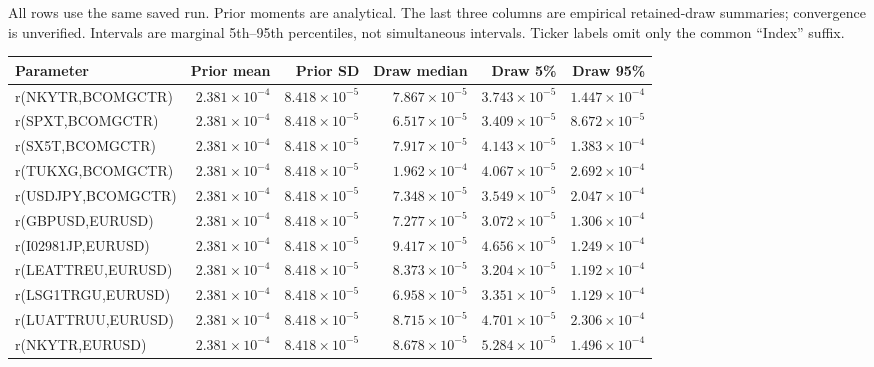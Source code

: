\documentclass[10pt,a4paper]{article}
\begin{document}
\small All rows use the same saved run. Prior moments are analytical.
The last three columns are empirical retained-draw summaries; convergence is unverified.
Intervals are marginal 5th--95th percentiles, not simultaneous intervals.
Ticker labels omit only the common ``Index'' suffix.
\par\medskip
\begingroup\fontsize{7.8}{10.5}\selectfont\setlength{\tabcolsep}{3pt}
\renewcommand{\arraystretch}{1.45}
\begin{tabular*}{\linewidth}{@{\extracolsep{\fill}}lrrrrr@{}}
\toprule
Parameter & Prior mean & Prior SD & Draw median & Draw 5\% & Draw 95\%\\
\midrule
r(NKYTR,BCOMGCTR) & $2.381\times10^{-4}$ & $8.418\times10^{-5}$ & $7.867\times10^{-5}$ & $3.743\times10^{-5}$ & $1.447\times10^{-4}$ \\
r(SPXT,BCOMGCTR) & $2.381\times10^{-4}$ & $8.418\times10^{-5}$ & $6.517\times10^{-5}$ & $3.409\times10^{-5}$ & $8.672\times10^{-5}$ \\
r(SX5T,BCOMGCTR) & $2.381\times10^{-4}$ & $8.418\times10^{-5}$ & $7.917\times10^{-5}$ & $4.143\times10^{-5}$ & $1.383\times10^{-4}$ \\
r(TUKXG,BCOMGCTR) & $2.381\times10^{-4}$ & $8.418\times10^{-5}$ & $1.962\times10^{-4}$ & $4.067\times10^{-5}$ & $2.692\times10^{-4}$ \\
r(USDJPY,BCOMGCTR) & $2.381\times10^{-4}$ & $8.418\times10^{-5}$ & $7.348\times10^{-5}$ & $3.549\times10^{-5}$ & $2.047\times10^{-4}$ \\
r(GBPUSD,EURUSD) & $2.381\times10^{-4}$ & $8.418\times10^{-5}$ & $7.277\times10^{-5}$ & $3.072\times10^{-5}$ & $1.306\times10^{-4}$ \\
r(I02981JP,EURUSD) & $2.381\times10^{-4}$ & $8.418\times10^{-5}$ & $9.417\times10^{-5}$ & $4.656\times10^{-5}$ & $1.249\times10^{-4}$ \\
r(LEATTREU,EURUSD) & $2.381\times10^{-4}$ & $8.418\times10^{-5}$ & $8.373\times10^{-5}$ & $3.204\times10^{-5}$ & $1.192\times10^{-4}$ \\
r(LSG1TRGU,EURUSD) & $2.381\times10^{-4}$ & $8.418\times10^{-5}$ & $6.958\times10^{-5}$ & $3.351\times10^{-5}$ & $1.129\times10^{-4}$ \\
r(LUATTRUU,EURUSD) & $2.381\times10^{-4}$ & $8.418\times10^{-5}$ & $8.715\times10^{-5}$ & $4.701\times10^{-5}$ & $2.306\times10^{-4}$ \\
r(NKYTR,EURUSD) & $2.381\times10^{-4}$ & $8.418\times10^{-5}$ & $8.678\times10^{-5}$ & $5.284\times10^{-5}$ & $1.496\times10^{-4}$ \\

\end{tabular*}
\end{document}
